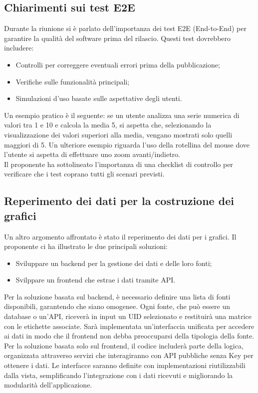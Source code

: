 \subsection{Chiarimenti sui test E2E}
Durante la riunione si è parlato dell'importanza dei test E2E (End-to-End) per garantire la qualità del software prima del rilascio. 
Questi test dovrebbero includere:
\begin{itemize}
    \item Controlli per correggere eventuali errori prima della pubblicazione;
    \item Verifiche sulle funzionalità principali;
    \item Simulazioni d'uso basate sulle aspettative degli utenti.
\end{itemize}
Un esempio pratico è il seguente: se un utente analizza una serie numerica di valori tra 1 e 10 e calcola la media 5, si aspetta che, selezionando la visualizzazione dei valori superiori alla media, vengano mostrati solo quelli maggiori di 5. 
Un ulteriore esempio riguarda l'uso della rotellina del mouse dove l'utente si aspetta di effettuare uno zoom avanti/indietro.
\\Il proponente ha sottolineato l'importanza di una checklist di controllo per verificare che i test coprano tutti gli scenari previsti.

\subsection{Reperimento dei dati per la costruzione dei grafici}
Un altro argomento affrontato è stato il reperimento dei dati per i grafici. 
Il proponente ci ha illustrato le due principali soluzioni:
\begin{itemize}
    \item Sviluppare un backend per la gestione dei dati e delle loro fonti;
    \item Svilppare un frontend che estrae i dati tramite API. 
\end{itemize}
Per la soluzione basata sul backend, è necessario definire una lista di fonti disponibili, garantendo che siano omogenee. 
Ogni fonte, che può essere un database o un'API, riceverà in input un UID selezionato e restituirà una matrice con le etichette associate. 
Sarà implementata un'interfaccia unificata per accedere ai dati in modo che il frontend non debba preoccuparsi della tipologia della fonte. 
\\
Per la soluzione basata solo sul frontend, il codice includerà parte della logica, organizzata attraverso servizi che interagiranno con API pubbliche senza Key per ottenere i dati. 
Le interfacce saranno definite con implementazioni riutilizzabili dalla vista, semplificando l'integrazione con i dati ricevuti e migliorando la modularità dell'applicazione.

